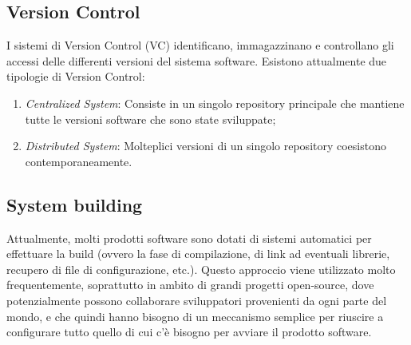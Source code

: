 \subsection{Version Control}
I sistemi di Version Control (VC) identificano, immagazzinano e controllano gli accessi delle differenti versioni del sistema software. Esistono attualmente due tipologie di Version Control:
\begin{enumerate}
	\item \emph{Centralized System}: Consiste in un singolo repository principale che mantiene tutte le versioni software che sono state sviluppate;
	\item \emph{Distributed System}: Molteplici versioni di un singolo repository coesistono contemporaneamente.
\end{enumerate}
\subsection{System building}
Attualmente, molti prodotti software sono dotati di sistemi automatici per effettuare la build (ovvero la fase di compilazione, di link ad eventuali librerie, recupero di file di configurazione, etc.). Questo approccio viene utilizzato molto frequentemente, soprattutto in ambito di grandi progetti open-source, dove
potenzialmente possono collaborare sviluppatori provenienti da ogni parte del mondo, e che quindi hanno bisogno di un meccanismo semplice per riuscire a configurare tutto quello di cui c’è bisogno per avviare il prodotto software.

